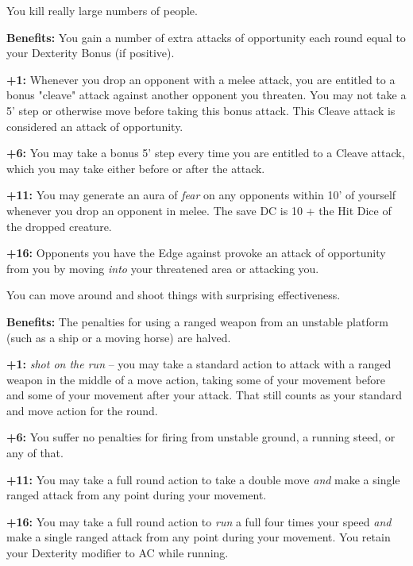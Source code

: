 
You kill really large numbers of people.

\textbf{Benefits:} You gain a number of extra attacks of opportunity each round equal to your Dexterity Bonus (if positive).

\textbf{+1:} Whenever you drop an opponent with a melee attack, you are entitled to a bonus "cleave" attack against another opponent you threaten. You may not take a 5' step or otherwise move before taking this bonus attack. This Cleave attack is considered an attack of opportunity.

\textbf{+6:} You may take a bonus 5' step every time you are entitled to a Cleave attack, which you may take either before or after the attack.

\textbf{+11:} You may generate an aura of \textit{fear} on any opponents within 10' of yourself whenever you drop an opponent in melee. The save DC is 10 + the Hit Dice of the dropped creature.

\textbf{+16:} Opponents you have the Edge against provoke an attack of opportunity from you by moving \textit{into} your threatened area or attacking you.


You can move around and shoot things with surprising effectiveness.

\textbf{Benefits:} The penalties for using a ranged weapon from an unstable platform (such as a ship or a moving horse) are halved.

\textbf{+1:} \textit{shot on the run} -- you may take a standard action to attack with a ranged weapon in the middle of a move action, taking some of your movement before and some of your movement after your attack. That still counts as your standard and move action for the round.

\textbf{+6:} You suffer no penalties for firing from unstable ground, a running steed, or any of that.

\textbf{+11:} You may take a full round action to take a double move \textit{and} make a single ranged attack from any point during your movement.

\textbf{+16:} You may take a full round action to \textit{run} a full four times your speed \textit{and} make a single ranged attack from any point during your movement. You retain your Dexterity modifier to AC while running.


